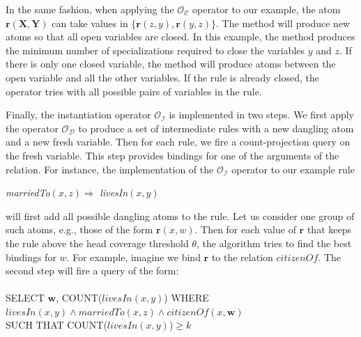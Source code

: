 In the same fashion, when applying the $\mathcal{O_C}$ operator to our example, the atom $\bm{r}(\bm{X}, \bm{Y})$ 
can take values in $\{ \bm{r}(z,y), \bm{r}(y,z) \}$.
The method will produce new atoms so that all open variables are closed. In this example, the method produces the minimum number
of specializations required to close the variables $y$ and $z$. If there is only one closed variable, the method will produce atoms between
the open variable and all the other variables. If the rule is already closed, the operator tries with
all possible pairs of variables in the rule.

Finally, the instantiation operator $\mathcal{O_I}$ is implemented in two steps. 
We first apply the operator $\mathcal{O_D}$ to produce a set of intermediate rules 
with a new dangling atom and a new fresh variable.
Then for each rule, we fire a count-projection query on the fresh variable. 
This step provides bindings for one of the arguments of the relation.
For instance, the implementation of the $\mathcal{O_I}$ operator to our example 
rule 
\begin{center}
\emph{marriedTo}$(x,z) \Rightarrow $ \emph{livesIn}$(x,y)$
\end{center}

\noindent will first add all possible dangling atoms to the rule. Let us consider one group of such atoms, e.g., those of the form
$\bm{r}(x,w)$. Then for each
value of $\bm{r}$ that keeps the rule above the head coverage threshold $\theta$, the algorithm tries to find the best bindings for 
$w$. For example, imagine we bind $\bm{r}$ to the relation $citizenOf$. The second step will fire a query of the form:
\\\\
\noindent
SELECT $\bm{w}$, COUNT($livesIn(x,y)$) WHERE \\ 
$livesIn(x,y) \wedge marriedTo(x,z) \wedge citizenOf(x,\bm{w})$ \\
SUCH THAT COUNT($livesIn(x,y)$)$\ge k$\\

